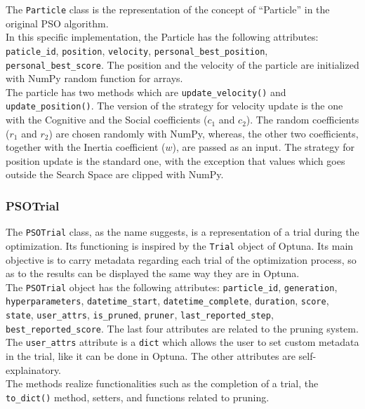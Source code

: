 The \texttt{Particle} class is the representation of the concept of “Particle” in the original PSO algorithm.
% 
\\[0.3cm]In this specific implementation, the Particle has the following attributes: \texttt{paticle\_id}, \texttt{position}, \texttt{velocity}, \texttt{personal\_best\_position}, \texttt{personal\_best\_score}.
The position and the velocity of the particle are initialized with NumPy random function for arrays.
% 
\\[0.3cm]The particle has two methods which are \texttt{update\_velocity()} and \texttt{update\_position()}. 
The version of the strategy for velocity update is the one with the Cognitive and the Social coefficients ($c_1$ and $c_2$). The random coefficients ($r_1$ and $r_2$) are chosen randomly with NumPy, whereas, the other two coefficients, together with the Inertia coefficient ($w$), are passed as an input.
The strategy for position update is the standard one, with the exception that values which goes outside the Search Space are clipped with NumPy.

\subsubsection{PSOTrial}

The \texttt{PSOTrial} class, as the name suggests, is a representation of a trial during the optimization. Its functioning is inspired by the \texttt{Trial} object of Optuna.
Its main objective is to carry metadata regarding each trial of the optimization process, so as to the results can be displayed the same way they are in Optuna.
% 
\\[0.3cm]The \texttt{PSOTrial} object has the following attributes: \texttt{particle\_id}, \texttt{generation}, \newline\texttt{hyperparameters}, \texttt{datetime\_start}, \texttt{datetime\_complete}, \texttt{duration}, \texttt{score}, \texttt{state}, \texttt{user\_attrs}, \texttt{is\_pruned}, \texttt{pruner}, \texttt{last\_reported\_step}, \texttt{best\_reported\_score}.
The last four attributes are related to the pruning system. The \texttt{user\_attrs} attribute is a \texttt{dict} which allows the user to set custom metadata in the trial, like it can be done in Optuna. The other attributes are self-explainatory.
% 
\\[0.3cm]The methods realize functionalities such as the completion of a trial, the \texttt{to\_dict()} method, setters, and functions related to pruning.

